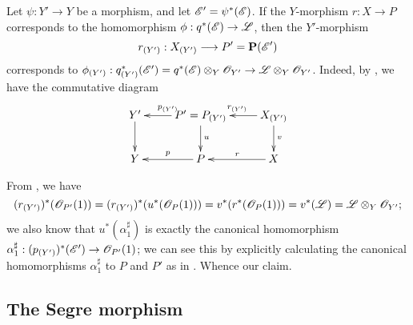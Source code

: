 \begin{env}[4.2.10]
\label{II.4.2.10}
Let $\psi:Y'\to Y$ be a morphism, and let $\mathscr{E}'=\psi^*(\mathscr{E})$.
If the $Y$-morphism $r:X\to P$ corresponds to the homomorphism $\vphi:q^*(\sh{E})\to\sh{L}$, then the $Y'$-morphism
\[
  r_{(Y')}: X_{(Y')} \to P' = \bb{P}(\sh{E}')
\]
corresponds to $\vphi_{(Y')}:q_{(Y')}^*(\sh{E}') = q^*(\sh{E})\otimes_Y\sh{O}_{Y'} \to \sh{L}\otimes_Y\sh{O}_{Y'}$.
Indeed, by , we have the commutative diagram
\[
  \xymatrix{
    Y' \ar[d]
    & P'=P_{(Y')} \ar[l]_{p_{(Y')}} \ar[d]^{u}
    & X_{(Y')} \ar[l]_{r_{(Y')}} \ar[d]^{v}
  \\Y
    & P \ar[l]_{p}
    & X \ar[l]_{r}
  }
\]

From , we have
\[
  (r_{(Y')})^*(\mathscr{O}_{P'}(1)) = (r_{(Y')})^*(u^*(\mathscr{O}_P(1))) = v^*(r^*(\mathscr{O}_P(1))) = v^*(\mathscr{L}) = \mathscr{L}\otimes_Y\mathscr{O}_{Y'};
\]
we also know that $u^*(\alpha_1^\sharp)$ is exactly the canonical homomorphism $\alpha_1^\sharp:(p_{(Y')})^*(\sh{E}')\to\sh{O}_{P'}(1)$;
we can see this by explicitly calculating the canonical homomorphisms $\alpha_1^\sharp$ to $P$ and $P'$ as in .
Whence our claim.
\end{env}


\subsection{The Segre morphism}
\label{subsection:II.4.3}

